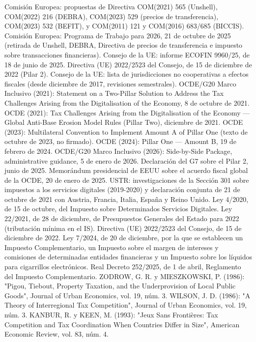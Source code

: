 \documentclass[10pt,a4paper]{article}
\begin{document}
Comisión Europea: propuestas de Directiva COM(2021) 565 (Unshell), COM(2022) 216 (DEBRA), COM(2023) 529 (precios de transferencia), COM(2023) 532 (BEFIT), y COM(2011) 121 y COM(2016) 683/685 (BICCIS).
Comisión Europea: Programa de Trabajo para 2026, 21 de octubre de 2025 (retirada de Unshell, DEBRA, Directiva de precios de transferencia e impuesto sobre transacciones financieras).
Consejo de la UE: informe ECOFIN 9960/25, de 18 de junio de 2025.
Directiva (UE) 2022/2523 del Consejo, de 15 de diciembre de 2022 (Pilar 2).
Consejo de la UE: lista de jurisdicciones no cooperativas a efectos fiscales (desde diciembre de 2017, revisiones semestrales).
OCDE/G20 Marco Inclusivo (2021): Statement on a Two-Pillar Solution to Address the Tax Challenges Arising from the Digitalisation of the Economy, 8 de octubre de 2021.
OCDE (2021): Tax Challenges Arising from the Digitalisation of the Economy — Global Anti-Base Erosion Model Rules (Pillar Two), diciembre de 2021.
OCDE (2023): Multilateral Convention to Implement Amount A of Pillar One (texto de octubre de 2023, no firmado).
OCDE (2024): Pillar One — Amount B, 19 de febrero de 2024.
OCDE/G20 Marco Inclusivo (2026): Side-by-Side Package, administrative guidance, 5 de enero de 2026.
Declaración del G7 sobre el Pilar 2, junio de 2025.
Memorándum presidencial de EEUU sobre el acuerdo fiscal global de la OCDE, 20 de enero de 2025.
USTR: investigaciones de la Sección 301 sobre impuestos a los servicios digitales (2019-2020) y declaración conjunta de 21 de octubre de 2021 con Austria, Francia, Italia, España y Reino Unido.
Ley 4/2020, de 15 de octubre, del Impuesto sobre Determinados Servicios Digitales.
Ley 22/2021, de 28 de diciembre, de Presupuestos Generales del Estado para 2022 (tributación mínima en el IS).
Directiva (UE) 2022/2523 del Consejo, de 15 de diciembre de 2022.
Ley 7/2024, de 20 de diciembre, por la que se establecen un Impuesto Complementario, un Impuesto sobre el margen de intereses y comisiones de determinadas entidades financieras y un Impuesto sobre los líquidos para cigarrillos electrónicos.
Real Decreto 252/2025, de 1 de abril, Reglamento del Impuesto Complementario.
ZODROW, G. R. y MIESZKOWSKI, P. (1986): "Pigou, Tiebout, Property Taxation, and the Underprovision of Local Public Goods", Journal of Urban Economics, vol. 19, núm. 3.
WILSON, J. D. (1986): "A Theory of Interregional Tax Competition", Journal of Urban Economics, vol. 19, núm. 3.
KANBUR, R. y KEEN, M. (1993): "Jeux Sans Frontières: Tax Competition and Tax Coordination When Countries Differ in Size", American Economic Review, vol. 83, núm. 4.
\end{document}
